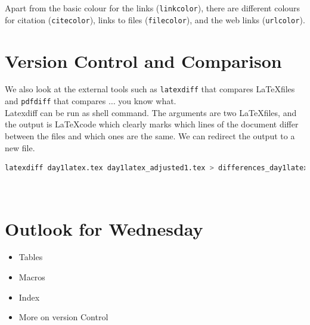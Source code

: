 \documentclass[a4paper,10pt]{report} %
\begin{document}
 Apart from the basic colour for the links (\texttt{linkcolor}), there are different colours for citation (\texttt{citecolor}), links to files (\texttt{filecolor}), and the web links (\texttt{urlcolor}).
 \pagebreak
 
 \section{Version Control and Comparison}
 We also look at the external tools such as \texttt{latexdiff} that compares \LaTeX files and  \texttt{pdfdiff} that compares \( \ldots \) you know what.\\
 
 Latexdiff can be run as shell command. The arguments are two \LaTeX files, and the output is \LaTeX code which clearly marks which lines of the document differ between the files and which ones are the same. We can redirect the output to a new file.
 
 \begin{lstlisting}[language={bash}, frame=single,basicstyle=\footnotesize]
  latexdiff day1latex.tex day1latex_adjusted1.tex > differences_day1latex.tex
\end{lstlisting}~\vspace{1ex}
  



\section{Outlook for Wednesday}\label{sec:wednesday}

\begin{itemize}
 \item Tables
 \item Macros
 \item Index
 \item More on version Control
\end{itemize}


 
\label{LastPage}
\newpage
\end{document}
